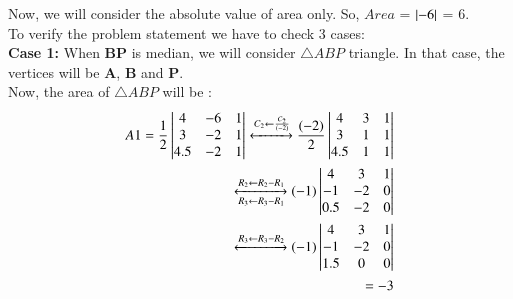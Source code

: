 Now, we will consider the absolute value of area only. So, $Area$ = $\left\vert-6\right\vert$ = 6.\\
To verify the problem statement we have to check 3 cases:\\
\textbf{Case 1:} When \textbf{BP} is median, we will consider $ \triangle ABP $ triangle. In that case, the vertices will be \textbf{A}, \textbf{B} and \textbf{P}.\\
Now, the area of $ \triangle ABP $ will be :\\
\begin{equation}
\begin{aligned}
    A1 = \frac{1}{2}\begin{vmatrix}
      4       & -6    & 1 \\ 
      3       & -2    & 1 \\
      4.5       & -2     & 1 \\
      
    \end{vmatrix} \xleftrightarrow[]{C_2\leftarrow \frac{C_2}{(-2)}} \frac{(-2)}{2}\begin{vmatrix}
      4       &3    & 1 \\ 
      3       &1    & 1 \\
      4.5       & 1    & 1 \\
      
    \end{vmatrix}\\
    \xleftrightarrow[R_3 \leftarrow R_3-R_1]{R_2\leftarrow R_2-R_1}
    (-1)\begin{vmatrix}
      4       & 3    & 1 \\ 
      -1       & -2    & 0 \\
      0.5       & -2   & 0 \\
      
    \end{vmatrix} \\ \xleftrightarrow[]{R_3 \leftarrow R_3-R_2}
    (-1)\begin{vmatrix}
      4       & 3    & 1 \\ 
      -1       & -2    & 0 \\
      1.5       & 0   & 0 \\
      
    \end{vmatrix}\\
    =-3
   \end{aligned}
  \end{equation}
